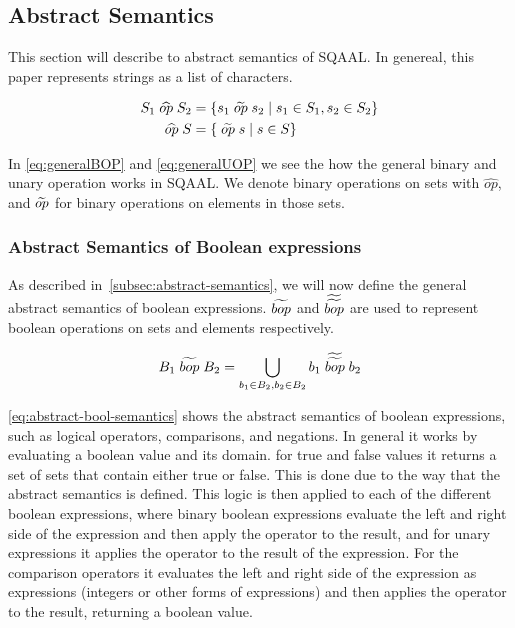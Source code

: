 \subsection{Abstract Semantics}\label{subsec:abstract-semantics}
This section will describe to abstract semantics of SQAAL.
In genereal, this paper represents strings as a list of characters. 

\begin{align}\label{eq:generalBOP}
    S_1 \aop S_2 &= \{ s_1 \aaop s_2 \mid s_1 \in S_1, s_2 \in S_2 \} \\ \label{eq:generalUOP}
    \aop S &= \{\aaop s \mid s \in S \}
\end{align}

In \autoref{eq:generalBOP} and \autoref{eq:generalUOP} we see the how the general binary and unary operation works in SQAAL.
We denote binary operations on sets with $\widehat{op}$, and $\widetilde{op}$ for binary operations on elements in those sets.


\subsubsection{Abstract Semantics of Boolean expressions}
As described in~\autoref{subsec:abstract-semantics}, we will now define the general abstract semantics of boolean expressions.
$\widetilde{bop}$ and $\widetilde{\widetilde{bop}}$ are used to represent boolean operations on sets and elements respectively.

\begin{align}
    B_1 \;\widetilde{bop}\; B_2 = \bigcup_{b_1 \in B_2, b_2 \in B_2} b_1 \;\widetilde{\widetilde{bop}}\; b_2
\end{align}

\autoref{eq:abstract-bool-semantics} shows the abstract semantics of boolean expressions, such as logical operators, comparisons, and negations.
In general it works by evaluating a boolean value and its domain. for true and false values it returns a set of sets that contain either true or false. This is done due to the way that the abstract semantics is defined.
This logic is then applied to each of the different boolean expressions, where binary boolean expressions evaluate the left and right side of the expression and then apply the operator to the result, and for unary expressions it applies the operator to the result of the expression.
For the comparison operators it evaluates the left and right side of the expression as expressions (integers or other forms of expressions) and then applies the operator to the result, returning a boolean value.

